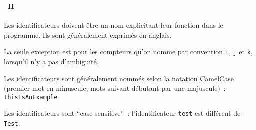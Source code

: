 \begin{frame}[containsverbatim]
  \frametitle{\secname}
  \framesubtitle{\subsecname~II} 

  Les identificateurs doivent être un nom explicitant leur fonction dans le programme. Ils sont généralement exprimés en anglais.
  \vspace{0.5cm}
  \par
  La seule exception est pour les compteurs qu'on nomme par convention \texttt{i}, \texttt{j} et \texttt{k}, lorsqu'il n'y a pas d'ambiguïté.
  \vspace{0.5cm}
  \par
  Les identificateurs sont généralement nommés selon la notation CamelCase (premier mot en minuscule, mots suivant débutant par une majuscule)~: \texttt{thisIsAnExample}
  \vspace{0.5cm}
  \par
  Les identificateurs sont ``case-sensitive''~: l'identificateur \verb|test| est différent de \verb|Test|.
\end{frame}

